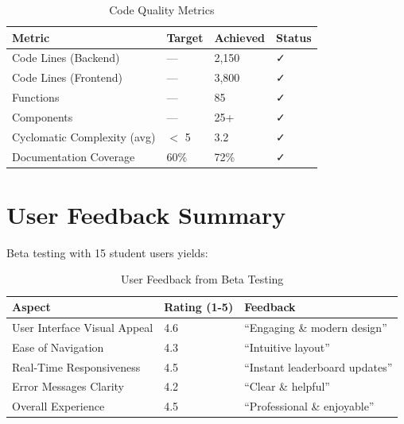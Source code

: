 \documentclass[12pt,a4paper]{report}
\newcommand{\rA}{\rowcolor{white}}
\newcommand{\rB}{\rowcolor{lightgray}}
\newcommand{\rH}{\rowcolor{headcol}}
\begin{document}
\begin{table}[H]
  \centering
  \small
  \begin{tabular}{|l|l|l|l|}
    \hline
    \rH \textbf{Metric} & \textbf{Target} & \textbf{Achieved} & \textbf{Status} \\
    \hline
    \rA Code Lines (Backend) & — & 2,150 & ✓ \\
    \hline
    \rB Code Lines (Frontend) & — & 3,800 & ✓ \\
    \hline
    \rA Functions & — & 85 & ✓ \\
    \hline
    \rB Components & — & 25+ & ✓ \\
    \hline
    \rA Cyclomatic Complexity (avg) & $<$ 5 & 3.2 & ✓ \\
    \hline
    \rB Documentation Coverage & 60\% & 72\% & ✓ \\
    \hline
  \end{tabular}
  \caption{Code Quality Metrics}
  \label{tab:code_quality}
\end{table}

\section{User Feedback Summary}

Beta testing with 15 student users yields:

\begin{table}[H]
  \centering
  \small
  \begin{tabular}{|l|l|l|}
    \hline
    \rH \textbf{Aspect} & \textbf{Rating (1-5)} & \textbf{Feedback} \\
    \hline
    \rA User Interface Visual Appeal & 4.6 & ``Engaging \& modern design'' \\
    \hline
    \rB Ease of Navigation & 4.3 & ``Intuitive layout'' \\
    \hline
    \rA Real-Time Responsiveness & 4.5 & ``Instant leaderboard updates'' \\
    \hline
    \rB Error Messages Clarity & 4.2 & ``Clear \& helpful'' \\
    \hline
    \rA Overall Experience & 4.5 & ``Professional \& enjoyable'' \\
    \hline
  \end{tabular}
  \caption{User Feedback from Beta Testing}
\end{table}

\cleardoublepage

\end{document}
